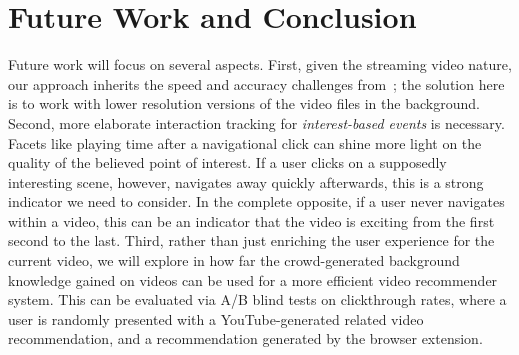 \documentclass[runningheads,a4paper]{llncs}
\begin{document}

\section{Future Work and Conclusion} \label{sec:future-work-conclusion}

Future work will focus on several aspects. First, given the streaming video nature, our approach inherits the speed and accuracy challenges from~\cite{artemis}; the solution here is to work with lower resolution versions of the video files in the background. Second, more elaborate interaction tracking for \emph{interest-based events} is necessary. Facets like playing time after a navigational click can shine more light on the quality of the believed point of interest. If a user clicks on a supposedly interesting scene, however, navigates away quickly afterwards, this is a strong indicator we need to consider. In the complete opposite, if a user never navigates within a video, this can be an indicator that the video is exciting from the first second to the last. Third, rather than just enriching the user experience for the current video, we will explore in how far the crowd-generated background knowledge gained on videos can be used for a more efficient video recommender system. This can be evaluated via A/B blind tests on clickthrough rates, where a user is randomly presented with a YouTube-generated related video recommendation, and a recommendation generated by the browser extension. 
\end{document}

